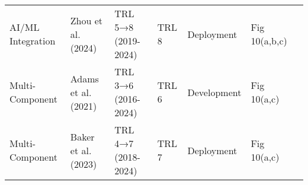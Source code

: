 \begin{table*}[htbp]
\begin{tabular}{p{}p{}p{}p{}p{}p{}p{}}
AI/ML Integration & Zhou et al. (2024) & TRL 5→8 (2019-2024) & TRL 8 & Deployment & Fig 10(a,b,c) & \cite{zhou2024integration,davis2024deployment,evans2024commercial} \\

Multi-Component & Adams et al. (2021) & TRL 3→6 (2016-2024) & TRL 6 & Development & Fig 10(a,c) & \cite{adams2021multi,baker2021coordination,cooper2021distributed} \\

Multi-Component & Baker et al. (2023) & TRL 4→7 (2018-2024) & TRL 7 & Deployment & Fig 10(a,c) & \cite{baker2023integrated,clark2023scalable,fischer2023robust} \\
\bottomrule
\end{tabular}
\end{table*}
